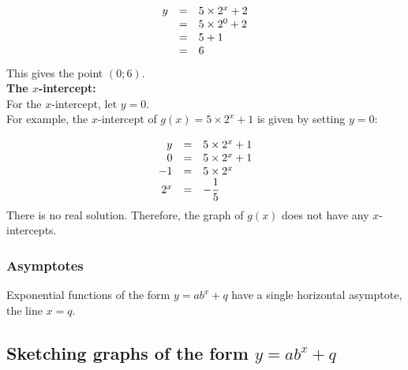 \begin{equation*}
\begin{array}{ccl}\hfill y& =& 5 \times 2^{x}+2\hfill \\
 \hfill & =& 5 \times 2^{0}+2\hfill \\
 & =& 5+1\hfill \\ & =& 6\hfill 
\end{array}
\end{equation*}
This gives the point $(0;6)$.\vspace{10pt}
\\
\textbf{The $x$-intercept:}\\
For the $x$-intercept, let $y=0$. \\
For example, the $x$-intercept of $g(x)=5 \times 2^{x}+1$ is given by setting $y=0$:\par 
\begin{equation*}
\begin{array}{ccl}\hfill y& =& 5 \times 2^{x}+1\hfill \\
 \hfill 0& =& 5 \times 2^{x}+1\hfill \\
 \hfill -1& =& 5 \times 2^{x}\hfill \\
 \hfill {2}^{x}& =& -\dfrac{1}{5}\hfill 
\end{array}
\end{equation*}
There is no real solution. Therefore, the graph of $g(x)$ does not have any $x$-intercepts.\par 

\subsubsection*{Asymptotes}

Exponential functions of the form $y=ab^{x}+q$ have a single horizontal asymptote, the line $x=q$. 


\subsection*{Sketching graphs of the form $y=ab^{x}+q$}

